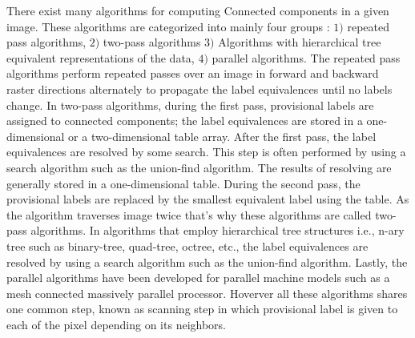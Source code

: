 There exist many algorithms for computing Connected components in a given image. These algorithms are categorized into
mainly four groups %
\cite{Suzuki2003_Linear}
: $1)$ repeated pass algorithms, $2)$ two-pass algorithms $3)$ Algorithms with hierarchical tree equivalent representations 
of the data, $4)$ parallel algorithms.
The repeated pass algorithms perform repeated passes over an image in forward and backward raster directions alternately
to propagate the label equivalences until no labels change.
In two-pass algorithms, during the first pass, provisional labels are assigned to connected components;
the label equivalences are stored in a one-dimensional or a two-dimensional table array. After the first pass, the label 
equivalences are resolved by some search. This step is often performed by using
a search algorithm such as the union-find algorithm.
The results of resolving are generally stored in a one-dimensional table. During the second pass, the provisional labels are 
replaced by the smallest equivalent label using the table. As the algorithm traverses image twice that's why these algorithms 
are called two-pass algorithms.
In algorithms that employ hierarchical tree structures i.e., n-ary tree such as binary-tree, quad-tree, octree, etc., the
label equivalences are resolved by using a search algorithm such as the union-find algorithm.
Lastly, the parallel algorithms have been developed for parallel machine models such as a mesh connected massively parallel processor.
Hoverver all these algorithms shares one common step, known as scanning step in which provisional label is given to each of the
pixel depending on its neighbors.

